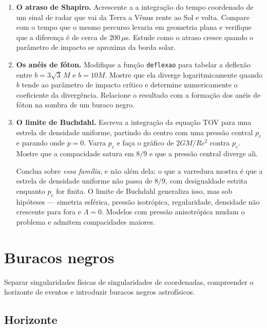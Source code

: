 \documentclass[12pt,a4paper,oneside]{book}
\theoremstyle{rgplain}
\theoremstyle{rgremark}
\begin{document}
\begin{enumerate}
  \item \textbf{O atraso de Shapiro.} Acrescente a
 a integração do tempo
coordenado de um sinal de radar que vai da Terra a Vênus rente ao Sol e
volta. Compare com o tempo que o mesmo percurso levaria em geometria plana e
verifique que a diferença é de cerca de $200\,\mu$s. Estude como o atraso
cresce quando o parâmetro de impacto se aproxima da borda solar.

  \item \textbf{Os anéis de fóton.} Modifique a função \texttt{deflexao} para
tabelar a deflexão entre $b=3\sqrt3\,M$ e $b=10M$. Mostre que ela diverge
logaritmicamente quando $b$ tende ao parâmetro de impacto crítico e
determine numericamente o coeficiente da divergência. Relacione o resultado
com a formação dos anéis de fóton na sombra de um buraco negro.

  \item \textbf{O limite de Buchdahl.} Escreva a integração da equação TOV para uma
estrela de densidade uniforme, partindo do centro com uma pressão central
$p_c$ e parando onde $p=0$. Varra $p_c$ e faça o gráfico de $2GM/Rc^2$
contra $p_c$. Mostre que a compacidade satura em $8/9$ e que a pressão
central diverge ali.

Conclua sobre \emph{essa família}, e não além dela: o que a varredura mostra
é que a estrela de densidade uniforme não passa de $8/9$, com desigualdade
estrita enquanto $p_c$ for finita. O limite de Buchdahl generaliza isso, mas
sob hipóteses --- simetria esférica, pressão isotrópica, regularidade,
densidade não crescente para fora e $\Lambda=0$. Modelos com pressão
anisotrópica mudam o problema e admitem compacidades maiores.
\end{enumerate}


\chapter{Buracos negros}
\label{cap:buracos-negros}

\begin{objetivos}
Separar singularidades físicas de singularidades de coordenadas, compreender o
horizonte de eventos e introduzir buracos negros astrofísicos.
\end{objetivos}

\section{Horizonte}
\label{sec:horizonte}
\end{document}
